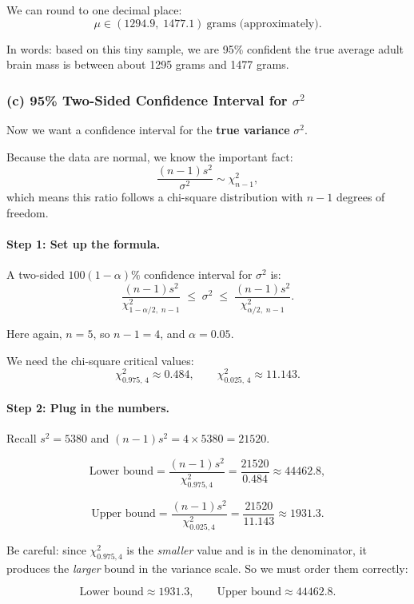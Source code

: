 \documentclass[11pt,letterpaper]{article}
\theoremstyle{remark}
\begin{document}
We can round to one decimal place:
\[
\boxed{\mu \in (1294.9,\; 1477.1)\ \text{grams (approximately).}}
\]

In words: based on this tiny sample, we are 95\% confident the true average adult brain mass
is between about 1295 grams and 1477 grams.

\subsubsection*{(c) 95\% Two-Sided Confidence Interval for $\sigma^2$}

Now we want a confidence interval for the \textbf{true variance} $\sigma^2$.

Because the data are normal, we know the important fact:
\[
\frac{(n-1)s^2}{\sigma^2} \sim \chi^2_{n-1},
\]
which means this ratio follows a chi-square distribution with $n-1$ degrees of freedom.

\paragraph{Step 1: Set up the formula.}

A two-sided $100(1-\alpha)\%$ confidence interval for $\sigma^2$ is:
\[
\frac{(n-1)s^2}{\chi^2_{1-\alpha/2,\; n-1}}
\;\le\; \sigma^2 \;\le\;
\frac{(n-1)s^2}{\chi^2_{\alpha/2,\; n-1}}.
\]

Here again, $n=5$, so $n-1 = 4$, and $\alpha = 0.05$.

We need the chi-square critical values:
\[
\chi^2_{0.975,\,4} \approx 0.484, \qquad
\chi^2_{0.025,\,4} \approx 11.143.
\]

\paragraph{Step 2: Plug in the numbers.}

Recall $s^2 = 5380$ and $(n-1)s^2 = 4 \times 5380 = 21520$.

\[
\text{Lower bound} =
\frac{(n-1)s^2}{\chi^2_{0.975,4}}
= \frac{21520}{0.484}
\approx 44462.8,
\]

\[
\text{Upper bound} =
\frac{(n-1)s^2}{\chi^2_{0.025,4}}
= \frac{21520}{11.143}
\approx 1931.3.
\]

Be careful: since $\chi^2_{0.975,4}$ is the \emph{smaller} value and is in the denominator, it produces the \emph{larger} bound in the variance scale. So we must order them correctly:

\[
\text{Lower bound} \approx 1931.3, \qquad
\text{Upper bound} \approx 44462.8.
\]
\end{document}
